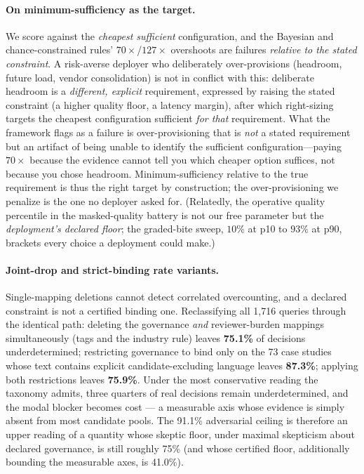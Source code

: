 \documentclass{article} %
\begin{document}
\paragraph{On minimum-sufficiency as the target.}
We score against the \emph{cheapest sufficient} configuration, and the Bayesian and chance-constrained rules' $70\times$/$127\times$ overshoots are failures \emph{relative to the stated constraint}. A risk-averse deployer who deliberately over-provisions (headroom, future load, vendor consolidation) is not in conflict with this: deliberate headroom is a \emph{different, explicit} requirement, expressed by raising the stated constraint (a higher quality floor, a latency margin), after which right-sizing targets the cheapest configuration sufficient \emph{for that} requirement. What the framework flags as a failure is over-provisioning that is \emph{not} a stated requirement but an artifact of being unable to identify the sufficient configuration---paying $70\times$ because the evidence cannot tell you which cheaper option suffices, not because you chose headroom. Minimum-sufficiency relative to the true requirement is thus the right target by construction; the over-provisioning we penalize is the one no deployer asked for. (Relatedly, the operative quality percentile in the masked-quality battery is not our free parameter but the \emph{deployment's declared floor}; the graded-bite sweep, $10\%$ at p10 to $93\%$ at p90, brackets every choice a deployment could make.)

\paragraph{Joint-drop and strict-binding rate variants.}
Single-mapping deletions cannot detect correlated overcounting, and a declared constraint is not a certified binding one. Reclassifying all 1{,}716 queries through the identical path: deleting the governance \emph{and} reviewer-burden mappings simultaneously (tags and the industry rule) leaves \textbf{75.1\%} of decisions underdetermined; restricting governance to bind only on the 73 case studies whose text contains explicit candidate-excluding language leaves \textbf{87.3\%}; applying both restrictions leaves \textbf{75.9\%}. Under the most conservative reading the taxonomy admits, three quarters of real decisions remain underdetermined, and the modal blocker becomes cost --- a measurable axis whose evidence is simply absent from most candidate pools. The 91.1\% adversarial ceiling is therefore an upper reading of a quantity whose skeptic floor, under maximal skepticism about declared governance, is still roughly 75\% (and whose certified floor, additionally bounding the measurable axes, is 41.0\%).
\end{document}

